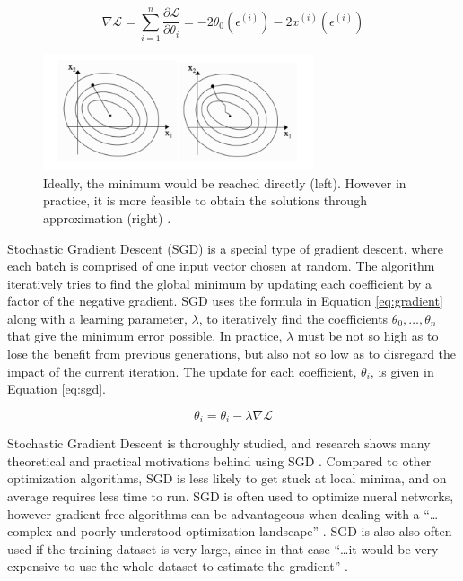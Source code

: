 \documentclass[letterpaper]{article} %
\begin{document}
\begin{equation}
\label{eq:gradient}
\nabla \mathcal{L} = \sum_{i=1}^{n}\frac{\partial \mathcal{L}}{\partial \theta_i} = -2\theta_0(\epsilon^{(i)}) - 2x^{(i)}(\epsilon^{(i)})
\end{equation}

\begin{figure}[htbp]
\centerline{\includegraphics[width=8cm]{machine_learning.png}}
\caption{Ideally, the minimum would be reached directly (left).
However in practice, it is more feasible to obtain the solutions through approximation (right)
\cite{machine_learning}.}
\label{fig:machine_learning}
\end{figure}

Stochastic Gradient Descent (SGD) is a special type of gradient descent,
where each batch is comprised of one input vector chosen at random.
The algorithm iteratively tries to find the global minimum
by updating each coefficient by a factor of the negative gradient.
SGD uses the formula in Equation \ref{eq:gradient} along with a learning parameter, $\lambda$,
to iteratively find the coefficients $\theta_{0},\dots,\theta_{n}$ that give the
minimum error possible.
In practice, $\lambda$ must be not so high as to lose the benefit from previous generations,
but also not so low as to disregard the impact of the current iteration.
The update for each coefficient, $\theta_i$, is given in Equation \ref{eq:sgd}.

\begin{equation}
\label{eq:sgd}
\theta_i = \theta_i - \lambda \nabla \mathcal{L}
\end{equation}

Stochastic Gradient Descent is thoroughly studied, and research shows many
theoretical and practical motivations behind using SGD
\cite{large-scale_optimization}.
Compared to other optimization algorithms,
SGD is less likely to get stuck at
local minima,
and on average requires less time to run.
SGD is often used to optimize nueral networks, however
gradient-free algorithms can be advantageous
when dealing with a
``\dots complex and poorly-understood optimization landscape''
\cite{evolutionary_sgd}.
SGD is also also often used if the training dataset is very large, since
in that case
``\dots it would be very expensive to use the whole dataset to estimate
the gradient'' \cite{machine_learning}.
\end{document}
